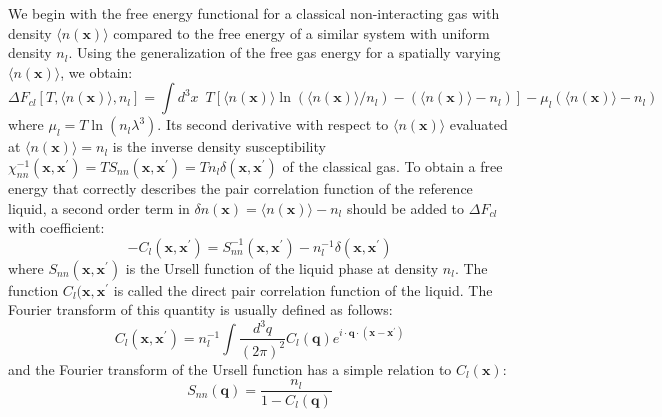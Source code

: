 \documentclass[12pt,a4paper]{article}
\begin{document}
We begin with the free energy functional for a classical non-interacting gas with density $\langle n(\textbf{x})\rangle$ compared to the free energy of a similar system with uniform density $n_l$. Using the generalization of the free gas energy for a spatially varying $\langle n(\textbf{x})\rangle$, we obtain:
\begin{equation}
\Delta F_{cl}[T,\langle n(\textbf{x})\rangle,n_l] = \int d^3 x\:\; T[\langle n(\textbf{x})\rangle \ln( \langle n(\textbf{x})\rangle / n_l ) - ( \langle n(\textbf{x})\rangle - n_l )] - \mu_l ( \langle n(\textbf{x})\rangle - n_l)
\end{equation}
where $\mu_l = T \ln(n_l \lambda^3)$. Its second derivative with respect to $\langle n(\textbf{x})\rangle$ evaluated at $ \langle n(\textbf{x})\rangle = n_l$ is the inverse density susceptibility $\chi^{-1}_{nn}(\textbf{x},\textbf{x}^\prime) = TS_{nn}(\textbf{x},\textbf{x}^\prime) = Tn_l \delta(\textbf{x},\textbf{x}^\prime) $ of the classical gas.
To obtain a free energy that correctly describes the pair correlation function of the reference liquid, a second order term in $\delta n(\textbf{x}) = \langle n(\textbf{x})\rangle - n_l$ should be added to $\Delta F_{cl}$ with coefficient:
\begin{equation}
-C_l(\textbf{x},\textbf{x}^\prime) = S^{-1}_{nn}(\textbf{x},\textbf{x}^\prime) - n^{-1}_l \delta(\textbf{x},\textbf{x}^\prime)
\end{equation}
where $S_{nn}(\textbf{x},\textbf{x}^\prime)$ is the Ursell function of the liquid phase at density $n_l$. 
The function $C_l(\textbf{x},\textbf{x}^\prime$ is called the direct pair correlation function of the liquid. The Fourier transform of this quantity is usually defined as follows:
\begin{equation}
C_l(\textbf{x},\textbf{x}^\prime)=n_l^{-1} \int \frac{d^3 q}{(2\pi)^2} C_l(\textbf{q})e^{i \cdot \textbf{q} \cdot (\textbf{x}-\textbf{x}^\prime)}
\end{equation}
and the Fourier transform of the Ursell function has a simple relation to $C_{l}(\textbf{x})$:
\begin{equation}
S_{nn}(\textbf{q})=\frac{n_l}{1-C_l(\textbf{q})}
\end{equation}
\end{document}
